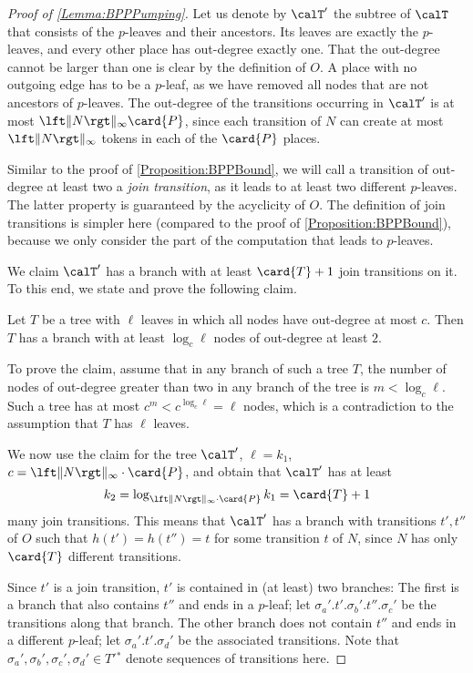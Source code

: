 \documentclass[../../diss.tex]{subfiles}
\begin{document}
\begin{proof}[Proof of \cref{Lemma:BPPPumping}]
    Let us denote by $\calT'$ the subtree of $\calT$ that consists of the $p$-leaves and their ancestors.
    Its leaves are exactly the $p$-leaves, and every other place has out-degree exactly one.
    That the out-degree cannot be larger than one is clear by the definition of $O$.
    A place with no outgoing edge has to be a $p$-leaf, as we have removed all nodes that are not ancestors of $p$-leaves.
    The out-degree of the transitions occurring in $\calT'$ is at most $\norminf{N} \card{P}$, since each transition of $N$ can create at most $\norminf{N}$ tokens in each of the $\card{P}$ places.

    Similar to the proof of \cref{Proposition:BPPBound}, we will call a transition of out-degree at least two a \emph{join transition}, as it leads to at least two different $p$-leaves.
    The latter property is guaranteed by the acyclicity of $O$.
    The definition of join transitions is simpler here (compared to the proof of \cref{Proposition:BPPBound}), because we only consider the part of the computation that leads to $p$-leaves.

    We claim $\calT'$ has a branch with at least $\card{T} + 1$ join transitions on it.
    To this end, we state and prove the following claim.


    Let $T$ be a tree with $\ell$ leaves in which all nodes have out-degree at most $c$.
    Then $T$ has a branch with at least $\log_c \ell$ nodes of out-degree at least $2$.

    To prove the claim, assume that in any branch of such a tree $T$, the number of nodes of out-degree greater than two in any branch of the tree is $m < \log_c \ell$.
    Such a tree has at most $c^m < c^{\log_c \ell} = \ell$ nodes, which is a contradiction to the assumption that $T$ has $\ell$ leaves.

    We now use the claim for the tree $\calT'$, $\ell = k_1$, $c = \norminf{N} \cdot \card{P}$, and obtain that $\calT'$ has at least
    \[
        k_2 = \log_{\norminf{N} \cdot \card{P} } k_1 = \card{T} + 1
    \]
    many join transitions.
    This means that $\calT'$ has a branch with transitions $t',t''$ of $O$ such that $h(t') = h(t'') = t$ for some transition $t$ of $N$, since $N$ has only $\card{T}$ different transitions.

    Since $t'$ is a join transition, $t'$ is contained in (at least) two branches:
    The first is a branch that also contains $t''$ and ends in a $p$-leaf; let $\sigma_a'.t'.\sigma_b'.t''.\sigma_c'$ be the transitions along that branch.
    The other branch does not contain $t''$ and ends in a different $p$-leaf; let $\sigma_a'.t'.\sigma_d'$ be the associated transitions.
    Note that $\sigma_a', \sigma_b', \sigma_c', \sigma_d' \in {T'}{}^*$ denote sequences of transitions here.


\end{proof}
\end{document}
